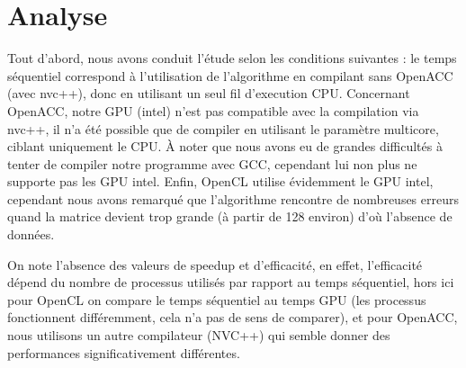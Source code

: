 \documentclass[a4paper, french]{article}
\begin{document}
\begin{center}
\end{center}

\newpage

\section{Analyse}

Tout d'abord, nous avons conduit l'étude selon les conditions suivantes : le temps séquentiel correspond à l'utilisation de l'algorithme en compilant sans OpenACC (avec nvc++), donc en utilisant un seul fil d'execution CPU. Concernant OpenACC, notre GPU (intel) n'est pas compatible avec la compilation via nvc++, il n'a été possible que de compiler en utilisant le paramètre multicore, ciblant uniquement le CPU. À noter que nous avons eu de grandes difficultés à tenter de compiler notre programme avec GCC, cependant lui non plus ne supporte pas les GPU intel. Enfin, OpenCL utilise évidemment le GPU intel, cependant nous avons remarqué que l'algorithme rencontre de nombreuses erreurs quand la matrice devient trop grande (à partir de 128 environ) d'où l'absence de données.

On note l'absence des valeurs de speedup et d'efficacité, en effet, l'efficacité dépend du nombre de processus utilisés par rapport au temps séquentiel, hors ici pour OpenCL on compare le temps séquentiel au temps GPU (les processus fonctionnent différemment, cela n'a pas de sens de comparer), et pour OpenACC, nous utilisons un autre compilateur (NVC++) qui semble donner des performances significativement différentes.
\end{document}
